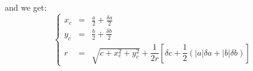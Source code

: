 \documentclass[aps,12pt]{revtex4}
\begin{document}
and we get:
\begin{equation}
\left\lbrace
\begin{array}{rcl}
	x_c & = & \frac{a}{2} + \frac{\delta a}{2}\\
	y_c & = & \frac{b}{2} + \frac{\delta b}{2}\\
	r   & = & \sqrt{c+x_c^2+y_c^2} + \dfrac{1}{2r}\left[ \delta{c} + \dfrac{1}{2}\left(|a|\delta a + |b| \delta b\right)\right]\
\end{array}
\right.
\end{equation}
\end{document}
